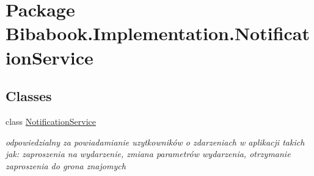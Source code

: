 \hypertarget{namespace_bibabook_1_1_implementation_1_1_notification_service}{}\section{Package Bibabook.\+Implementation.\+Notification\+Service}
\label{namespace_bibabook_1_1_implementation_1_1_notification_service}
\subsection*{Classes}
\begin{DoxyCompactItemize}
\item 
class \hyperlink{class_bibabook_1_1_implementation_1_1_notification_service_1_1_notification_service}{Notification\+Service}
\begin{DoxyCompactList}\small\item\em odpowiedzialny za powiadamianie uzytkowników o zdarzeniach w aplikacji takich jak\+: zaproszenia na wydarzenie, zmiana parametrów wydarzenia, otrzymanie zaproszenia do grona znajomych \end{DoxyCompactList}\end{DoxyCompactItemize}
